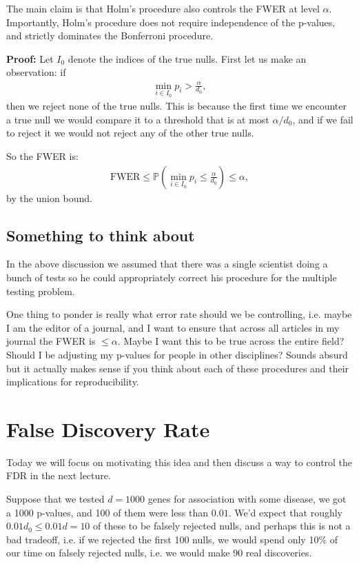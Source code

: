 \documentclass[twoside,12pt]{article}
\begin{document}
The main claim is that Holm's procedure also controls the FWER at level $\alpha$. Importantly, Holm's procedure does not require independence of the p-values, and strictly dominates the Bonferroni procedure.

{\bf Proof: } Let $I_0$ denote the indices of the true nulls. First let us make an observation: if 
\begin{align*}
\min_{i \in I_0} p_i > \frac{\alpha}{d_0},
\end{align*}
then we reject none of the true nulls. This is because the first time we encounter a true null we would compare it to a threshold that is at most $\alpha/d_0$, and if we fail to reject it we would not reject any of the other true nulls.

So the FWER is:
\begin{align*}
\text{FWER} \leq \mathbb{P}\left(\min_{i \in I_0} p_i \leq \frac{\alpha}{d_0}\right) \leq \alpha,
\end{align*}
by the union bound.

\subsection{Something to think about} 
In the above discussion we assumed that there was a single scientist doing a bunch of tests so he could appropriately correct his procedure for the multiple testing problem. 

One thing to ponder is really what error rate should we be controlling, i.e. maybe I am the editor of a journal, and I want to ensure that across all  articles in my journal the FWER is $\leq \alpha$. Maybe I want this to be true across the entire field? Should I be adjusting my p-values for people in other disciplines? Sounds absurd but it actually makes sense if you think about each of these procedures and their implications for reproducibility.


\section{False Discovery Rate}
Today we will focus on motivating this idea and then discuss a way to control the FDR in the next lecture. 

Suppose that we tested $d = 1000$ genes for association with some disease, we got a 1000 p-values, and 100 of them were less than $0.01$.
We'd expect that roughly $0.01 d_0 \leq 0.01 d = 10$ of these to be falsely rejected nulls, and perhaps this is not a bad tradeoff, i.e. if we rejected the first 100 nulls, we would spend only 10\% of our time on falsely rejected nulls, i.e. we would make 90 real discoveries. 
\end{document}
